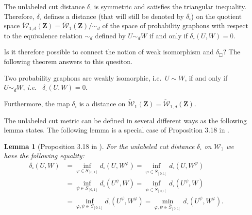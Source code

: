 \documentclass[12pt,twoside,a4paper]{article}
\newtheorem{lemma}[theorem]{Lemma}
\newcommand{\ie}{i.e.\ }
\newcommand{\Space}{\mathbf{Z}}
\newcommand{\Graphon}{\mathcal{W}_1}
\newcommand{\UGraphon}{\widetilde{\mathcal{W}}_1}
\newcommand{\UGraphond}{\widetilde{\mathcal{W}}_{1,d}}
\newcommand{\InvRelabel}{S_{[0,1]}}
\newcommand{\Relabel}{\bar{S}_{[0,1]}}
\newcommand{\simd}{\sim_{d}}
\newcommand{\dd}{\delta_{\square}}
\begin{document}
The unlabeled cut distance  $\dd$ is symmetric and satisfies the triangular inequality.  Therefore, $\dd$ defines a distance (that will still be denoted by $\dd $) on the quotient space $\UGraphond(\Space) = \UGraphon (\Space)/ \simd$ of the space of probability graphons with respect to the equivalence relation $\simd$ defined by $U\simd W$  if and only if  $\dd(U,W)=0$.

Is it therefore possible to connect the notion of weak isomorphism and $\delta_\Box$? The following theorem answers to this quesiton.

\begin{theorem}
   \label{theo:Wm=W}
   Two probability graphons are weakly isomorphic, \ie $U \sim W$, if and only if
   $U \simd W$, \emph{\ie}  $\dd(U,W) = 0$.

   Furthermore, the map $\dd$ is a distance on $\UGraphon(\Space)=\UGraphond(\Space).$
\end{theorem}

The unlabeled cut metric can be defined in several different ways as the following lemma states. The following lemma is a special case of Proposition 3.18 in \cite{abraham2023probabilitygraphons}.


\begin{lemma}[Proposition 3.18 in \cite{abraham2023probabilitygraphons}]\label{thm_min_dist}
 For the unlabeled cut distance $\dd$ on $\Graphon$ we have the following equality:
\begin{equation}
  \label{eq_premetric}
  \begin{aligned}
\dd(U,W) 
& = \underset{\varphi\in \InvRelabel}{\inf} d_{\square}(U,W^\varphi) 
  = \underset{\varphi\in \Relabel}{\inf} d_{\square}(U,W^\varphi)\\
& = \underset{\psi\in \InvRelabel}{\inf} d_{\square}(U^\psi,W) 
= \underset{\psi\in \Relabel}{\inf} d_{\square}(U^\psi,W) 	\\
& = \underset{\varphi, \psi\in \InvRelabel}{\inf} d_{\square}(U^\psi,W^\varphi) 
= \underset{\varphi,\psi\in \Relabel}{\min} d_{\square}(U^\psi,W^\varphi).
\end{aligned}
\end{equation}
\end{lemma}
\end{document}
